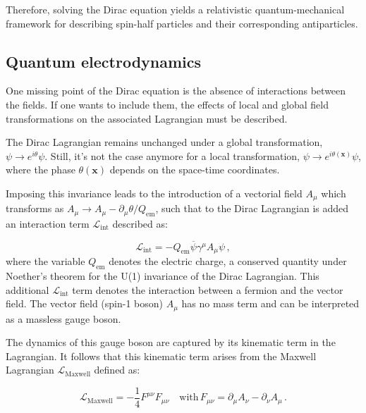 Therefore, solving the Dirac equation yields a relativistic quantum-mechanical framework for describing spin-half particles and their corresponding antiparticles.


\subsection{Quantum electrodynamics}

One missing point of the Dirac equation is the absence of interactions between the fields. If one wants to include them, the effects of local and global field transformations on the associated Lagrangian must be described. 

\vspace{0.5 cm}

The Dirac Lagrangian remains unchanged under a global transformation, $\psi \rightarrow e^{i\theta}\psi$. Still, it's not the case anymore for a local transformation, $\psi \rightarrow e^{i\theta(\textbf{x})}\psi$, where the phase $\theta(\textbf{x})$ depends on the space-time coordinates.

Imposing this invariance leads to the introduction of a vectorial field $A_\mu$ which transforms as $A_\mu \rightarrow A_\mu - \partial_\mu\theta/Q_\mathrm{em}$, such that to the Dirac Lagrangian is added an interaction term $\mathcal{L}_{\mathrm{int}}$ described as:

\begin{equation}
    \mathcal{L}_{\mathrm{int}} = - Q_\mathrm{em} \overline{\psi} \gamma^\mu A_\mu \psi \, ,
\end{equation}
where the variable $Q_\mathrm{em}$ denotes the electric charge, a conserved quantity under Noether's theorem for the U(1) invariance of the Dirac Lagrangian. This additional $\mathcal{L}_{\mathrm{int}}$ term denotes the interaction between a fermion and the vector field. The vector field (spin-1 boson) $A_\mu$ has no mass term and can be interpreted as a massless gauge boson.

\vspace{0.5 cm}

The dynamics of this gauge boson are captured by its kinematic term in the Lagrangian. It follows that this kinematic term arises from the Maxwell Lagrangian $\mathcal{L}_{\mathrm{Maxwell}}$ defined as:

\begin{equation}
    \mathcal{L}_{\mathrm{Maxwell}} = -\frac{1}{4}F^{\mu\nu}F_{\mu\nu} \quad \mathrm{with} \, F_{\mu\nu} = \partial_\mu A_\nu - \partial_\nu A_\mu \, .
\end{equation}

